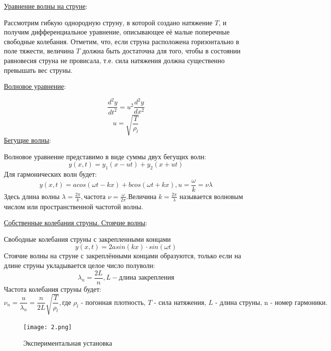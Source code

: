 \documentclass[a4paper]{article}
\begin{document}
\underline{Уравнение волны на струне}:\par

Рассмотрим гибкую однородную струну, в которой создано натяжение $T$, и получим дифференциальное уравнение, описывающее её малые поперечные свободные колебания. Отметим, что, если струна расположена горизонтально в поле тяжести, величина $T$ должна быть достаточна для того, чтобы в состоянии равновесия струна не провисала, т.е. сила натяжения должна существенно превышать вес струны.

\underline{Волновое уравнение}:\par

\[\frac{d^2y}{dt^2} = u^2\frac{d^2y}{dx^2}\]
\[u = \sqrt{\frac{T}{\rho_{l}}}\]
\underline{Бегущие волны}:\par

Волновое уравнение представимо в виде суммы двух бегущих волн:
\[y(x,t) = y_{1}(x - ut) + y_{2}(x + ut)\]
Для гармонических волн будет:
\[y(x,t) = a cos(\omega t - kx) + b cos(\omega t + kx), u = \frac{\omega}{k} = \nu \lambda\]
Здесь длина волны $\lambda = \frac{2\pi}{k}, \text{частота } \nu = \frac{\omega}{2\pi} . \text{Величина } k = \frac{2\pi}{\lambda}$ называется волновым числом или пространственной частотой волны.

\underline{Собственные колебания струны. Стоячие волны}:\par

Свободные колебания струны с закрепленными концами
\[y(x,t) = 2a sin(kx) \cdot sin(\omega t)\]
Стоячие волны на струне с закреплёнными концами образуются, только если на длине струны укладывается целое число полуволн:
\[\lambda_{n} = \frac{2L}{n}, L - \text{длина закрепления}\]
Частота колебания струны будет:
\[\nu_{n} = \frac{u}{\lambda_{n}} = \frac{n}{2L}\sqrt{\frac{T}{\rho_{l}}},\text{где $\rho_{l}$ - погонная плотность, $T$ - сила натяжения, $L$ - длина струны, n - номер гармоники.}\]

\begin{figure}[t]
    \centering
    \texttt{[image: 2.png]}
    \caption{Экспериментальная установка}
\end{figure}
\end{document}
